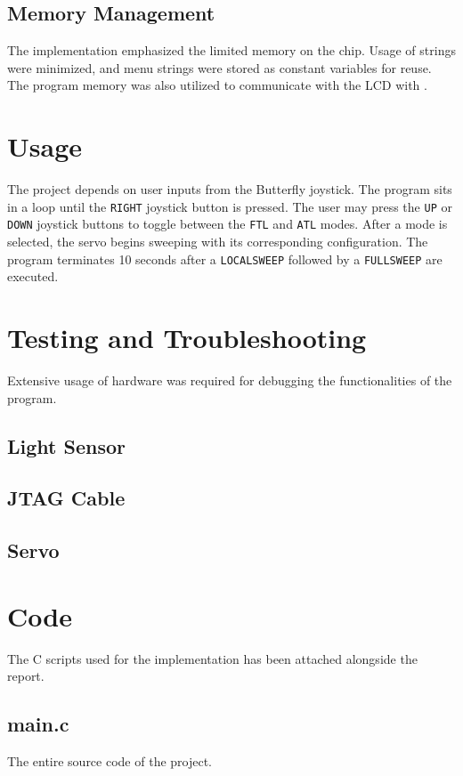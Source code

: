 \documentclass[usletter, 12pt]{article}
\begin{document}
    \subsection{Memory Management} The implementation emphasized the limited
    memory on the chip. Usage of strings were minimized, and menu strings were
    stored as constant  variables for reuse. The program
    memory was also utilized to communicate with the LCD with
    .

    \section{Usage} The project depends on user inputs from the Butterfly
    joystick. The program sits in a loop until the \texttt{RIGHT} joystick
    button is pressed. The user may press the \texttt{UP} or \texttt{DOWN}
    joystick buttons to toggle between the \texttt{FTL} and \texttt{ATL} modes.
    After a mode is selected, the servo begins sweeping with its corresponding
    configuration. The program terminates 10 seconds after a
    \texttt{LOCALSWEEP} followed by a \texttt{FULLSWEEP} are executed.

    \section{Testing and Troubleshooting} Extensive usage of hardware was
    required for debugging the functionalities of the program. 

        \subsection{Light Sensor}


        \subsection{JTAG Cable}

        \subsection{Servo}

    \section{Code} The C scripts used for the implementation has been attached
    alongside the report.

        \subsection{main.c} The entire source code of the project.
\end{document}
